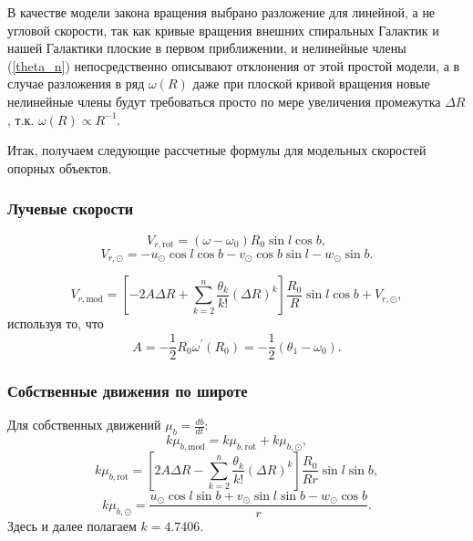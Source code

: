 \documentclass{matmex-diploma-custom}
\begin{document}
\par В качестве модели закона вращения выбрано разложение для линейной, а не угловой скорости, так как кривые вращения внешних спиральных Галактик и нашей Галактики плоские в первом приближении, и нелинейные члены (\ref{theta_n}) непосредственно описывают отклонения от этой простой модели, а в случае разложения в ряд $\omega(R)$ даже при плоской кривой вращения новые нелинейные члены будут требоваться просто по мере увеличения промежутка $\Delta R$, т.к. $\omega(R) \propto R^{-1}$.

\par Итак, получаем следующие рассчетные формулы для модельных скоростей опорных объектов.

\subsubsection{Лучевые скорости} \label{def_mod_vr}
\begin{equation}
        V_{r, \mathrm{rot}} = (\omega - \omega_0)R_0 \sin{l} \cos{b},
\end{equation}
\begin{equation}
        V_{r, \odot} = -u_{\odot} \cos{l} \cos{b} - v_{\odot} \cos{b} \sin{l} - w_{\odot} \sin{b}.
\end{equation}

\begin{equation}
        V_{r, \mathrm{mod}} = \left[ -2A\Delta R + \sum^n_{k = 2} \frac{\theta_k}{k!} \left( \Delta R \right)^k \right] \frac{R_0}{R} \sin{l} \cos{b} + V_{r, \odot},
\end{equation}
используя то, что
\begin{equation}
        A = - \frac{1}{2} R_0 \omega^{'}(R_0) = - \frac{1}{2} (\theta_1 - \omega_0).
\end{equation}
\subsubsection{Собственные движения по широте} \label{def_mod_b}
Для собственных движений $\mu_b = \frac{db}{dt}$:
\begin{equation}
        k\mu_{b, \mathrm{mod}} = k\mu_{b, \mathrm{rot}} + k\mu_{b, \odot},
\end{equation}
\begin{equation}
        k\mu_{b, \mathrm{rot}} = \left[ 2A\Delta R - \sum^n_{k = 2} \frac{\theta_k}{k!} \left( \Delta R \right)^k \right] \frac{R_0}{Rr} \sin{l} \sin{b},
\end{equation}
\begin{equation}
        k\mu_{b, \odot} = \frac{u_{\odot}\cos{l}\sin{b} + v_{\odot}\sin{l}\sin{b} - w_{\odot}\cos{b}}{r}.
\end{equation}
Здесь и далее полагаем $k=4.7406$.
\end{document}
